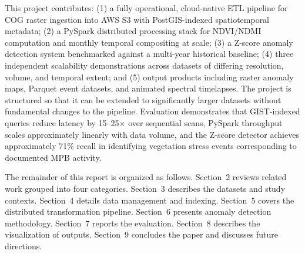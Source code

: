 This project contributes: (1) a fully operational, cloud-native ETL pipeline for COG raster ingestion into AWS S3 with PostGIS-indexed spatiotemporal metadata; (2) a PySpark distributed processing stack for NDVI/NDMI computation and monthly temporal compositing at scale; (3) a Z-score anomaly detection system benchmarked against a multi-year historical baseline; (4) three independent scalability demonstrations across datasets of differing resolution, volume, and temporal extent; and (5) output products including raster anomaly maps, Parquet event datasets, and animated spectral timelapses. The project is structured so that it can be extended to significantly larger datasets without fundamental changes to the pipeline. Evaluation demonstrates that GIST-indexed queries reduce latency by 15--25$\times$ over sequential scans, PySpark throughput scales approximately linearly with data volume, and the Z-score detector achieves approximately 71\% recall in identifying vegetation stress events corresponding to documented MPB activity.

The remainder of this report is organized as follows. Section~2 reviews related work grouped into four categories. Section~3 describes the datasets and study contexts. Section~4 details data management and indexing. Section~5 covers the distributed transformation pipeline. Section~6 presents anomaly detection methodology. Section~7 reports the evaluation. Section~8 describes the visualization of outputs. Section~9 concludes the paper and discusses future directions.